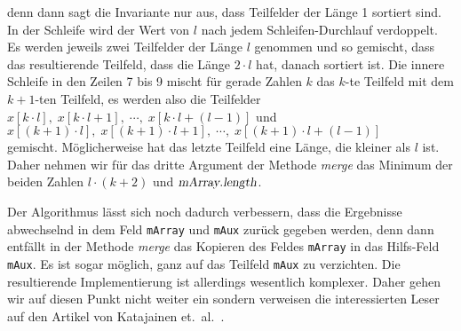 denn dann sagt die Invariante nur aus, dass Teilfelder der L\"ange 1 sortiert sind.  In der
Schleife wird der Wert von $l$ nach jedem Schleifen-Durchlauf verdoppelt.   
Es werden jeweils zwei Teilfelder der L\"ange $l$ genommen und so gemischt, dass das
resultierende Teilfeld, dass die L\"ange $2\cdot l$ hat, danach sortiert ist.  Die innere Schleife in
den Zeilen 7 bis 9 mischt f\"ur gerade Zahlen $k$ das $k$-te Teilfeld mit dem $k+1$-ten
Teilfeld, es werden also die Teilfelder
\\[0.1cm]
\hspace*{1.3cm}
$x[k\cdot l],\;x[k\cdot l+1],\;\cdots,\;x[k\cdot l+(l-1)]$ \quad und
\\[0.1cm]
\hspace*{1.3cm}
 $x[(k+1)\cdot l],\;x[(k+1)\cdot l+1],\;\cdots,\;x[(k+1)\cdot l+(l-1)]$ 
\\[0.1cm]
gemischt.  M\"oglicherweise hat das letzte Teilfeld eine L\"ange, die kleiner als $l$ ist.
Daher nehmen wir f\"ur das dritte Argument der Methode \textsl{merge} das Minimum der beiden
Zahlen $l\cdot(k+2)$ und $\textsl{mArray}.\textsl{length}$.

Der Algorithmus l\"asst sich noch dadurch verbessern, dass die Ergebnisse abwechselnd in dem 
Feld \texttt{mArray} und \texttt{mAux} zur\"uck gegeben werden, denn dann entf\"allt in der
Methode \textsl{merge} das Kopieren
des Feldes \texttt{mArray} in das Hilfs-Feld \texttt{mAux}.  
Es ist sogar m\"oglich, ganz auf das Teilfeld \texttt{mAux} zu verzichten.  
Die resultierende Implementierung ist allerdings wesentlich komplexer.  Daher gehen wir
auf diesen Punkt nicht weiter ein sondern verweisen die interessierten Leser auf den Artikel von
Katajainen et.~al.~\cite{katajainen:96}.

